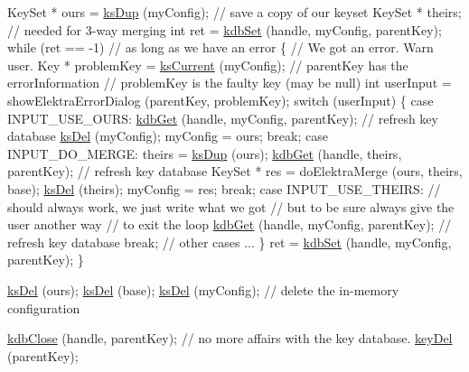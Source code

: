 \begin{DoxyCodeInclude}
KeySet * ours = \hyperlink{group__keyset_gac59e4b328245463f1451f68d5106151c}{ksDup} (myConfig); \textcolor{comment}{// save a copy of our keyset}
KeySet * theirs;                  \textcolor{comment}{// needed for 3-way merging}
\textcolor{keywordtype}{int} ret = \hyperlink{group__kdb_ga11436b058408f83d303ca5e996832bcf}{kdbSet} (handle, myConfig, parentKey);
\textcolor{keywordflow}{while} (ret == -1) \textcolor{comment}{// as long as we have an error}
\{
        \textcolor{comment}{// We got an error. Warn user.}
        Key * problemKey = \hyperlink{group__keyset_ga4287b9416912c5f2ab9c195cb74fb094}{ksCurrent} (myConfig);
        \textcolor{comment}{// parentKey has the errorInformation}
        \textcolor{comment}{// problemKey is the faulty key (may be null)}
        \textcolor{keywordtype}{int} userInput = showElektraErrorDialog (parentKey, problemKey);
        \textcolor{keywordflow}{switch} (userInput)
        \{
        \textcolor{keywordflow}{case} INPUT\_USE\_OURS:
                \hyperlink{group__kdb_ga28e385fd9cb7ccfe0b2f1ed2f62453a1}{kdbGet} (handle, myConfig, parentKey); \textcolor{comment}{// refresh key database}
                \hyperlink{group__keyset_ga27e5c16473b02a422238c8d970db7ac8}{ksDel} (myConfig);
                myConfig = ours;
                \textcolor{keywordflow}{break};
        \textcolor{keywordflow}{case} INPUT\_DO\_MERGE:
                theirs = \hyperlink{group__keyset_gac59e4b328245463f1451f68d5106151c}{ksDup} (ours);
                \hyperlink{group__kdb_ga28e385fd9cb7ccfe0b2f1ed2f62453a1}{kdbGet} (handle, theirs, parentKey); \textcolor{comment}{// refresh key database}
                KeySet * res = doElektraMerge (ours, theirs, base);
                \hyperlink{group__keyset_ga27e5c16473b02a422238c8d970db7ac8}{ksDel} (theirs);
                myConfig = res;
                \textcolor{keywordflow}{break};
        \textcolor{keywordflow}{case} INPUT\_USE\_THEIRS:
                \textcolor{comment}{// should always work, we just write what we got}
                \textcolor{comment}{// but to be sure always give the user another way}
                \textcolor{comment}{// to exit the loop}
                \hyperlink{group__kdb_ga28e385fd9cb7ccfe0b2f1ed2f62453a1}{kdbGet} (handle, myConfig, parentKey); \textcolor{comment}{// refresh key database}
                \textcolor{keywordflow}{break};
                \textcolor{comment}{// other cases ...}
        \}
        ret = \hyperlink{group__kdb_ga11436b058408f83d303ca5e996832bcf}{kdbSet} (handle, myConfig, parentKey);
\}

\hyperlink{group__keyset_ga27e5c16473b02a422238c8d970db7ac8}{ksDel} (ours);
\hyperlink{group__keyset_ga27e5c16473b02a422238c8d970db7ac8}{ksDel} (base);
\hyperlink{group__keyset_ga27e5c16473b02a422238c8d970db7ac8}{ksDel} (myConfig); \textcolor{comment}{// delete the in-memory configuration}

\hyperlink{group__kdb_gadb54dc9fda17ee07deb9444df745c96f}{kdbClose} (handle, parentKey); \textcolor{comment}{// no more affairs with the key database.}
\hyperlink{group__key_ga3df95bbc2494e3e6703ece5639be5bb1}{keyDel} (parentKey);
\end{DoxyCodeInclude}
